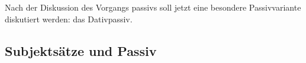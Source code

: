



Nach der Diskussion des Vorgangs%
passivs soll jetzt eine besondere
Passivvariante diskutiert werden: das Dativpassiv.


\subsection{Subjektsätze und Passiv}



